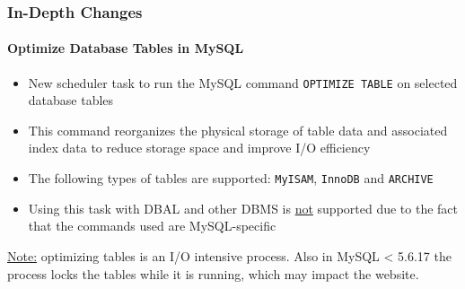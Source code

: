 \begin{frame}[fragile]
	\frametitle{In-Depth Changes}
	\framesubtitle{Optimize Database Tables in MySQL}

	\begin{itemize}

		\item New scheduler task to run the MySQL command \texttt{OPTIMIZE TABLE}
			on selected database tables

		\item This command reorganizes the physical storage of table data and associated
			index data to reduce storage space and improve I/O efficiency

		\item The following types of tables are supported:\newline
			\texttt{MyISAM}, \texttt{InnoDB} and \texttt{ARCHIVE}

		\item Using this task with DBAL and other DBMS is \underline{not} supported
			due to the fact that the commands used are MySQL-specific

	\end{itemize}


	\begingroup
		\color{red}
			\small
				\underline{Note:} optimizing tables is an I/O intensive process.
				Also in MySQL < 5.6.17 the process locks the tables while it is running,
				which may impact the website.
			\normalsize
	\endgroup

\end{frame}


